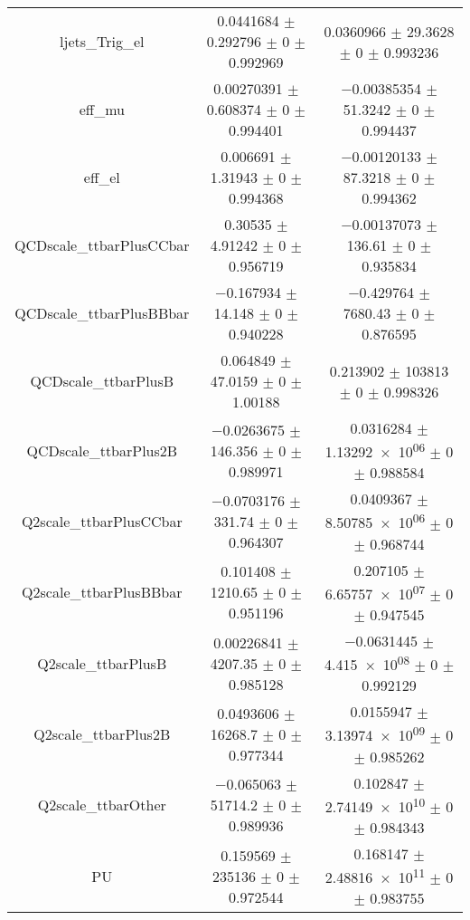 \begin{table}
\begin{tabular}{ccc}
ljets\_Trig\_el & \num{0.0441684} $\pm$ \num{0.292796} $\pm$ \num{0} $\pm$ \num{0.992969} & \num{0.0360966} $\pm$ \num{29.3628} $\pm$ \num{0} $\pm$ \num{0.993236}\\
eff\_mu & \num{0.00270391} $\pm$ \num{0.608374} $\pm$ \num{0} $\pm$ \num{0.994401} & \num{-0.00385354} $\pm$ \num{51.3242} $\pm$ \num{0} $\pm$ \num{0.994437}\\
eff\_el & \num{0.006691} $\pm$ \num{1.31943} $\pm$ \num{0} $\pm$ \num{0.994368} & \num{-0.00120133} $\pm$ \num{87.3218} $\pm$ \num{0} $\pm$ \num{0.994362}\\
QCDscale\_ttbarPlusCCbar & \num{0.30535} $\pm$ \num{4.91242} $\pm$ \num{0} $\pm$ \num{0.956719} & \num{-0.00137073} $\pm$ \num{136.61} $\pm$ \num{0} $\pm$ \num{0.935834}\\
QCDscale\_ttbarPlusBBbar & \num{-0.167934} $\pm$ \num{14.148} $\pm$ \num{0} $\pm$ \num{0.940228} & \num{-0.429764} $\pm$ \num{7680.43} $\pm$ \num{0} $\pm$ \num{0.876595}\\
QCDscale\_ttbarPlusB & \num{0.064849} $\pm$ \num{47.0159} $\pm$ \num{0} $\pm$ \num{1.00188} & \num{0.213902} $\pm$ \num{103813} $\pm$ \num{0} $\pm$ \num{0.998326}\\
QCDscale\_ttbarPlus2B & \num{-0.0263675} $\pm$ \num{146.356} $\pm$ \num{0} $\pm$ \num{0.989971} & \num{0.0316284} $\pm$ \num{1.13292e+06} $\pm$ \num{0} $\pm$ \num{0.988584}\\
Q2scale\_ttbarPlusCCbar & \num{-0.0703176} $\pm$ \num{331.74} $\pm$ \num{0} $\pm$ \num{0.964307} & \num{0.0409367} $\pm$ \num{8.50785e+06} $\pm$ \num{0} $\pm$ \num{0.968744}\\
Q2scale\_ttbarPlusBBbar & \num{0.101408} $\pm$ \num{1210.65} $\pm$ \num{0} $\pm$ \num{0.951196} & \num{0.207105} $\pm$ \num{6.65757e+07} $\pm$ \num{0} $\pm$ \num{0.947545}\\
Q2scale\_ttbarPlusB & \num{0.00226841} $\pm$ \num{4207.35} $\pm$ \num{0} $\pm$ \num{0.985128} & \num{-0.0631445} $\pm$ \num{4.415e+08} $\pm$ \num{0} $\pm$ \num{0.992129}\\
Q2scale\_ttbarPlus2B & \num{0.0493606} $\pm$ \num{16268.7} $\pm$ \num{0} $\pm$ \num{0.977344} & \num{0.0155947} $\pm$ \num{3.13974e+09} $\pm$ \num{0} $\pm$ \num{0.985262}\\
Q2scale\_ttbarOther & \num{-0.065063} $\pm$ \num{51714.2} $\pm$ \num{0} $\pm$ \num{0.989936} & \num{0.102847} $\pm$ \num{2.74149e+10} $\pm$ \num{0} $\pm$ \num{0.984343}\\
PU & \num{0.159569} $\pm$ \num{235136} $\pm$ \num{0} $\pm$ \num{0.972544} & \num{0.168147} $\pm$ \num{2.48816e+11} $\pm$ \num{0} $\pm$ \num{0.983755}\\

\end{tabular}
\end{table}
